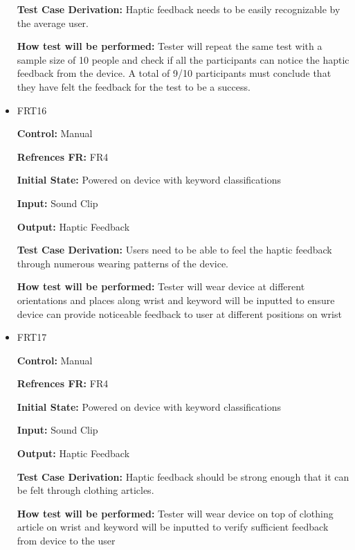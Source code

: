 \documentclass[12pt, titlepage]{article}
\begin{document}
\begin{itemize}
\textbf{Test Case Derivation:} Haptic feedback needs to be easily recognizable by the average user.
					
\textbf{How test will be performed:} Tester will repeat the same test with a sample size of 10 people and check if all the participants can notice the haptic feedback from the device. A total of 9/10 participants must conclude that they have felt the feedback for the test to be a success.


\item{FRT16}

\textbf{Control:} Manual

\textbf{Refrences FR:} FR4 					

\textbf{Initial State:} Powered on device with keyword classifications
					
\textbf{Input:} Sound Clip
					
\textbf{Output:} Haptic Feedback

\textbf{Test Case Derivation:} Users need to be able to feel the haptic feedback through numerous wearing patterns of the device.
					
\textbf{How test will be performed:} Tester will wear device at different orientations and places along wrist and keyword will be inputted to ensure device can provide noticeable feedback to user at different positions on wrist


\item{FRT17}

\textbf{Control:} Manual

\textbf{Refrences FR:} FR4 					

\textbf{Initial State:} Powered on device with keyword classifications
					
\textbf{Input:} Sound Clip
					
\textbf{Output:} Haptic Feedback

\textbf{Test Case Derivation:} Haptic feedback should be strong enough that it can be felt through clothing articles.
					
\textbf{How test will be performed:} Tester will wear device on top of clothing article on wrist and keyword will be inputted to verify sufficient feedback from device to the user


\end{itemize}
\end{document}
